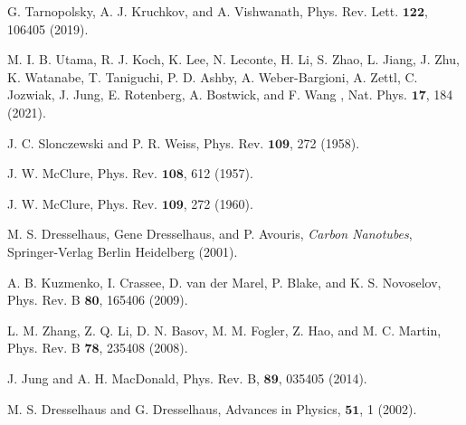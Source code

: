 \documentclass[showpacs,aps,prb,reprint,twocolumn]{revtex4-1}
\begin{document}
\begin{thebibliography}{99}


 G. Tarnopolsky, A. J. Kruchkov, and A. Vishwanath, Phys. Rev. Lett. $\mathbf{122}$, 106405 (2019).


 M. I. B. Utama, R. J. Koch, K. Lee, N. Leconte, H. Li, S. Zhao, L. Jiang, J. Zhu, K. Watanabe, T. Taniguchi, P. D. Ashby, A. Weber-Bargioni, A. Zettl, C. Jozwiak, J. Jung, E. Rotenberg, A. Bostwick, and F. Wang , Nat. Phys. $\mathbf{17}$, 184 (2021).




 J. C. Slonczewski and P. R. Weiss,  Phys. Rev. $\mathbf{109}$, 272 (1958).

 J. W. McClure, Phys. Rev. $\mathbf{108}$, 612 (1957).

 J. W. McClure,  Phys. Rev. $\mathbf{109}$, 272 (1960).

 M. S. Dresselhaus, Gene Dresselhaus, and P. Avouris, \textit{Carbon Nanotubes}, Springer-Verlag Berlin Heidelberg (2001).


 A. B. Kuzmenko, I. Crassee, D. van der Marel, P. Blake, and K. S. Novoselov, Phys. Rev. B $\mathbf{80}$, 165406 (2009).

 L. M. Zhang, Z. Q. Li, D. N. Basov, M. M. Fogler, Z. Hao, and M. C. Martin, Phys. Rev. B $\mathbf{78}$, 235408 (2008).

 J. Jung and A. H. MacDonald, Phys. Rev. B, $\mathbf{89}$, 035405 (2014).

 M. S. Dresselhaus and G. Dresselhaus, Advances in Physics, $\mathbf{51}$, 1 (2002).


\end{thebibliography}
\end{document}
